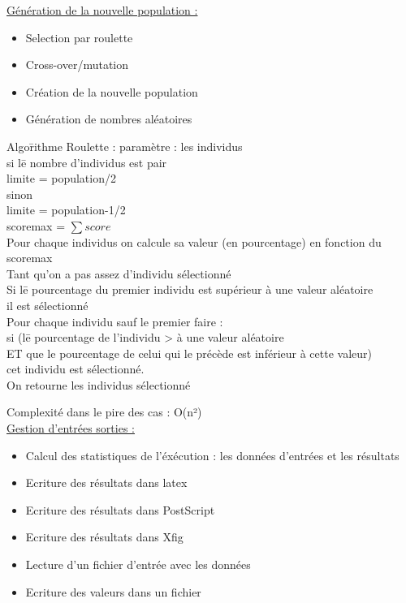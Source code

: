 \documentclass[a4paper,11pt]{article}
\begin{document}
		\underline{Génération de la nouvelle population : }
		\begin{itemize}
			\item Selection par roulette
			\item Cross-over/mutation
			\item Création de la nouvelle population
			\item Génération de nombres aléatoires
		\end{itemize}
		\begin{tabbing} 
		Algo\=rithme Roulette : paramètre : les individus\\
			\>si l\=e nombre d’individus est pair\\
			\>	\>limite = population/2\\
			\>sinon\\
			\>	\>limite = population-1/2\\
			\>scoremax = $\sum score$\\
			\>Pour chaque individus on calcule sa valeur (en pourcentage) en fonction du scoremax\\
			\>Tant qu’on a pas assez d’individu sélectionné\\
			\>	\>Si l\=e pourcentage du premier individu est supérieur à une valeur aléatoire\\
			\>	\>\>il est sélectionné\\
			\>	\>Pour chaque individu sauf le premier faire :\\
			\>	\>\>si (l\=e pourcentage de l'individu > à une valeur aléatoire\\ 
			\>	\>\>ET que le pourcentage de celui qui le précède est inférieur à cette valeur)\\
			\>	\>\>\>cet individu est sélectionné.\\
			\>On retourne les individus sélectionné
		\end{tabbing}
		Complexité dans le pire des cas : O(n²)\\
		
		\underline{Gestion d'entrées sorties : }
		\begin{itemize}
			\item Calcul des statistiques de l'éxécution : les données d'entrées et les résultats
			\item Ecriture des résultats dans latex
			\item Ecriture des résultats dans PostScript
			\item Ecriture des résultats dans Xfig
			\item Lecture d'un fichier d'entrée avec les données
			\item Ecriture des valeurs dans un fichier\\
		\end{itemize}
		
\end{document}
